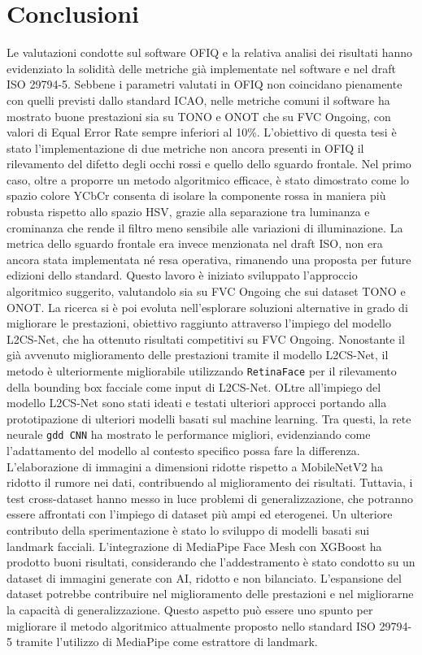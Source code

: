 \documentclass[12pt,a4paper,openright,twoside]{book}
\begin{document}
\chapter{Conclusioni}
Le valutazioni condotte sul software OFIQ e la relativa analisi dei risultati hanno evidenziato la solidità delle metriche già implementate nel software e nel draft ISO 29794-5. Sebbene i parametri valutati in OFIQ non coincidano pienamente con quelli previsti dallo standard ICAO, nelle metriche comuni il software ha mostrato buone prestazioni sia su TONO e ONOT che su FVC Ongoing, con valori di Equal Error Rate sempre inferiori al 10\%.  
L'obiettivo di questa tesi è stato l'implementazione di due metriche non ancora presenti in OFIQ\: il rilevamento del difetto degli occhi rossi e quello dello sguardo frontale. Nel primo caso, oltre a proporre un metodo algoritmico efficace, è stato dimostrato come lo spazio colore YCbCr consenta di isolare la componente rossa in maniera più robusta rispetto allo spazio HSV, grazie alla separazione tra luminanza e crominanza che rende il filtro meno sensibile alle variazioni di illuminazione.  
La metrica dello sguardo frontale era invece menzionata nel draft ISO, non era ancora stata implementata né resa operativa, rimanendo una proposta per future edizioni dello standard. Questo lavoro è iniziato sviluppato l'approccio algoritmico suggerito, valutandolo sia su FVC Ongoing che sui dataset TONO e ONOT. La ricerca si è poi evoluta nell'esplorare soluzioni alternative in grado di migliorare le prestazioni, obiettivo raggiunto attraverso l'impiego del modello L2CS-Net, che ha ottenuto risultati competitivi su FVC Ongoing.
Nonostante il già avvenuto miglioramento delle prestazioni tramite il modello L2CS-Net, il metodo è ulteriormente migliorabile utilizzando \texttt{RetinaFace} per il rilevamento della bounding box facciale come input di L2CS-Net.
OLtre all'impiego del modello L2CS-Net sono stati ideati e testati ulteriori approcci portando alla prototipazione di ulteriori modelli basati sul machine learning. Tra questi, la rete neurale \texttt{gdd CNN} ha mostrato le performance migliori, evidenziando come l'adattamento del modello al contesto specifico possa fare la differenza. L'elaborazione di immagini a dimensioni ridotte rispetto a MobileNetV2 ha ridotto il rumore nei dati, contribuendo al miglioramento dei risultati. Tuttavia, i test cross-dataset hanno messo in luce problemi di generalizzazione, che potranno essere affrontati con l'impiego di dataset più ampi ed eterogenei.  
Un ulteriore contributo della sperimentazione è stato lo sviluppo di modelli basati sui landmark facciali. L'integrazione di MediaPipe Face Mesh con XGBoost ha prodotto buoni risultati, considerando che l'addestramento è stato condotto su un dataset di immagini generate con AI, ridotto e non bilanciato. L'espansione del dataset potrebbe contribuire nel miglioramento delle prestazioni e nel migliorarne la capacità di generalizzazione. Questo aspetto può essere uno spunto per migliorare il metodo algoritmico attualmente proposto nello standard ISO 29794-5 tramite l'utilizzo di MediaPipe come estrattore di landmark.  
\end{document}
